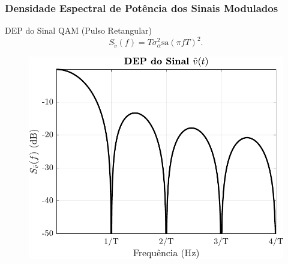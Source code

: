 \documentclass{beamer}
\newcommand{\pag}[1] {\begin{frame}#1\end{frame}}
\begin{document}
\pag{
	\frametitle{Densidade Espectral de Potência dos Sinais Modulados}
	\begin{block}{DEP do Sinal QAM (Pulso Retangular)}
		\begin{equation}
			S_{\tilde{v}}(f) = T\sigma_{\alpha}^2\mathrm{sa}(\pi f T)^2.
		\end{equation}
	\end{block}
	\begin{figure}[!h]
		\centering
	  \includegraphics[width = 0.6\linewidth]{QAMDEP.pdf}
		\label{SinalQAM}
	\end{figure}
}

\end{document}
